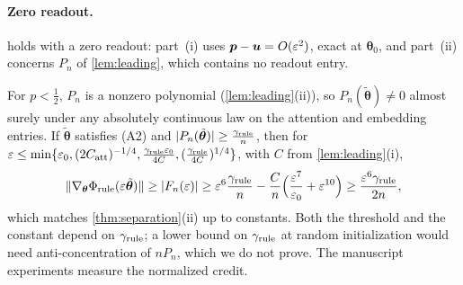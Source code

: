\paragraph{Zero readout.}\label{rem:zero-readout}  holds with a zero readout: part~(i) uses $\bm p-\bm u=O(\varepsilon^2)$, exact at $\bm\theta_0$, and part~(ii) concerns $P_n$ of
\cref{lem:leading}, which contains no readout entry.


\begin{remark}
\label{rem:generic-rule}
For $p<\frac{1}{2}$, $P_n$ is a nonzero polynomial (\cref{lem:leading}(ii)), so $P_n(\tilde{\bm\theta})\ne0$ almost surely under any absolutely continuous law on
the attention and embedding entries. If $\tilde{\bm\theta}$ satisfies (A2) and $|P_n(\tilde{\bm\theta})|\ge\frac{\gamma_{\mathrm{rule}}}{n}$, then for
$\varepsilon\le\min\{\varepsilon_0,(2C_{\mathrm{att}})^{-1/4},\frac{\gamma_{\mathrm{rule}}\varepsilon_0}{4C},(\frac{\gamma_{\mathrm{rule}}}{4C})^{1/4}\}$, with $C$ from \cref{lem:leading}(i),
\[
 \|\nabla_{\bm\theta}\Phi_{\mathrm{rule}}(\varepsilon\tilde{\bm\theta})\|\ge|F_n(\varepsilon)|\ge\varepsilon^6\frac{\gamma_{\mathrm{rule}}}{n}-\frac{C}{n}\Bigl(\frac{\varepsilon^7}{\varepsilon_0}+\varepsilon^{10}\Bigr)\ge\frac{\varepsilon^6\gamma_{\mathrm{rule}}}{2n},
\]
which matches \cref{thm:separation}(ii) up to constants. Both the threshold and the constant depend on $\gamma_{\mathrm{rule}}$; a lower bound on $\gamma_{\mathrm{rule}}$
at random initialization would need anti-concentration of $nP_n$, which we do not prove. The manuscript experiments measure the normalized credit.
\end{remark}

